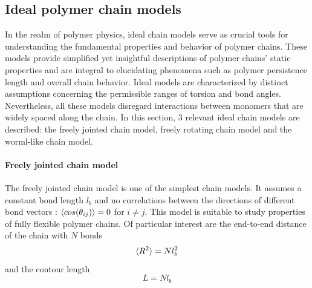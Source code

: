 \documentclass[
    paper=A4,pagesize=automedia,fontsize=12pt,
    BCOR=15mm,DIV=22,
    twoside,headinclude,footinclude=false,
    fleqn,             %
    bibliography=totocnumbered,          %
    listof=totoc,                %
    listof=flat,                 %
    cleardoublepage=empty      %
    numbers=endperiod
]{scrartcl}
\begin{document}
\subsection{Ideal polymer chain models}

In the realm of polymer physics, ideal chain models serve as crucial tools
for understanding the fundamental properties and behavior of polymer chains. 
These models provide simplified yet insightful descriptions of polymer chains' 
static properties and are integral to elucidating phenomena such as
polymer persistence length and overall chain behavior.
Ideal models are characterized by distinct assumptions concerning the 
permissible ranges of torsion and bond angles. Nevertheless, all 
these models disregard interactions between monomers that are widely 
spaced along the chain.
In this section, 3 relevant ideal chain models are described: 
the freely jointed chain model, freely rotating chain model and the worml-like chain model.

\paragraph{Freely jointed chain model}
The freely jointed chain model is one of the simplest chain models. It assumes
a constant bond length $l_b$ \cite{Rub_Colby_PolyPhy:2005} and no correlations between the directions of different
bond vectors \cite{Rub_Colby_PolyPhy:2005}: $\langle cos(\theta_{ij})\rangle = 0$ for $i \neq j$. This model is suitable
to study properties of fully flexible polymer chains. Of particular interest
are the end-to-end distance of the chain with $N$ bonds
\begin{equation}
    \langle R^2\rangle = N l_b^2
\end{equation}
and the contour length 
\begin{equation}
    L = N l_b
\end{equation}
\end{document}
